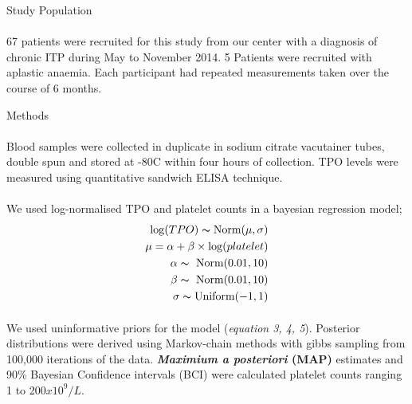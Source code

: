 \documentclass[landscape,a0paper,fontscale=0.285]{beamer} %
\newlength{\onecolwid}
\begin{document}
\begin{frame}[t]
\begin{columns}[t]
\begin{column}{\onecolwid}
\begin{block}{Study Population}
\paragraph{} 67 patients were recruited for this study from our center with a diagnosis of chronic ITP during May to November 2014. 5 Patients were recruited with aplastic anaemia. Each participant had repeated measurements taken over the course of 6 months.  



\end{block}

\begin{block}{Methods}
\paragraph{}Blood samples were collected in duplicate in sodium citrate vacutainer tubes, double spun and stored at -80\textdegree C within four hours of collection. TPO levels were measured using quantitative sandwich ELISA technique.
\paragraph{} We used log-normalised TPO and platelet counts in a bayesian regression model;
\begin{align}
    \log(TPO) \thicksim \text{Norm}(\mu, \sigma) \\
    \mu = \alpha + \beta\times \log(platelet) \\
    \alpha \thicksim\ \text{Norm}(0.01, 10) \\
    \beta \thicksim\ \text{Norm}(0.01, 10) \\
    \sigma \thicksim \text{Uniform}(-1, 1)
\end{align}
\paragraph{} We used uninformative priors for the model (\textit{equation 3, 4, 5}). Posterior distributions were derived using Markov-chain methods with gibbs sampling from 100,000 iterations of the data. \textbf{\textit{Maximium a posteriori} (MAP)} estimates and 90\% Bayesian Confidence intervals (BCI) were calculated platelet counts ranging 1 to 200$x10^9/L$. 
\end{block}



\end{column}
\end{columns}
\end{frame}
\end{document}
